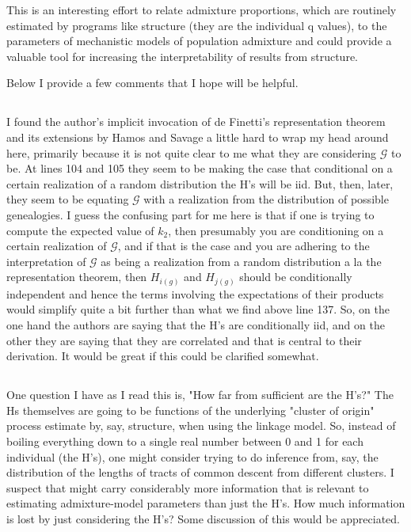 \documentclass[11pt]{amsart}
\begin{document}
This is an interesting effort to relate admixture proportions, which are routinely estimated by programs
like structure (they are the individual q values), to the parameters of mechanistic models of population
admixture and could provide a valuable tool for increasing the interpretability of results from structure.

Below I provide a few comments that I hope will be helpful.

\subsection{} I found the author's implicit invocation of de Finetti's representation theorem and its extensions by
Hamos and Savage a little hard to wrap my head around here, primarily because it is not quite clear to me
what they are considering $\mathcal{G}$ to be. At lines 104 and 105 they seem to be making the case that
conditional on a certain realization of a random distribution the H's will be iid. But, then, later, they seem
to be equating $\mathcal{G}$ with a realization from the distribution of possible genealogies. I guess the
confusing part for me here is that if one is trying to compute the expected value of $k_2$, then presumably
you are conditioning on a certain realization of $\mathcal{G}$, and if that is the case and you are adhering to
the interpretation of $\mathcal{G}$ as being a realization from a random distribution a la the representation
theorem, then $H_{i(g)}$ and $H_{j(g)}$ should be conditionally independent and hence the terms involving the
expectations of their products would simplify quite a bit further than what we find above line 137. So, on
the one hand the authors are saying that the H's are conditionally iid, and on the other they are saying that
they are correlated and that is central to their derivation. It would be great if this could be clarified
somewhat.

\subsection{} One question I have as I read this is, "How far from sufficient are the H's?" The Hs themselves are going
to be functions of the underlying "cluster of origin" process estimate by, say, structure, when using the
linkage model. So, instead of boiling everything down to a single real number between 0 and 1 for each
individual (the H's), one might consider trying to do inference from, say, the distribution of the lengths of
tracts of common descent from different clusters. I suspect that might carry considerably more
information that is relevant to estimating admixture-model parameters than just the H's. How much
information is lost by just considering the H's? Some discussion of this would be appreciated.
\end{document}
